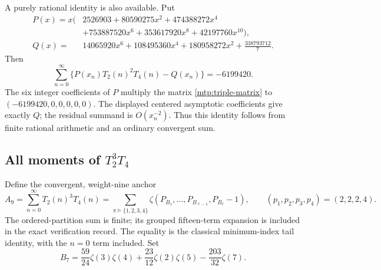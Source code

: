 \documentclass[11pt,letterpaper]{article}
\numberwithin{equation}{section}
\theoremstyle{definition}
\theoremstyle{remark}
\begin{document}
A purely rational identity is also available. Put
\begin{align*}
 P(x)=x\bigl(&2526903+80590275x^2+474388272x^4\\
             &+753887520x^6+353617920x^8+42197760x^{10}\bigr),\\
 Q(x)={}&14065920x^6+108495360x^4+180958272x^2+\frac{338793712}{7}.
\end{align*}
Then
\begin{equation}\label{mtp:rational-sum}
 \sum_{n=0}^{\infty}\bigl\{P(x_n)T_2(n)^2T_4(n)-Q(x_n)\bigr\}
                                      =-6199420.
\end{equation}
The six integer coefficients of $P$ multiply the matrix
\eqref{mtp:triple-matrix} to $(-6199420,0,0,0,0,0)$.
The displayed centered asymptotic coefficients give exactly $Q$;
the residual summand is $O(x_n^{-2})$. Thus this identity follows from
finite rational arithmetic and an ordinary convergent sum.

\subsection{All moments of \texorpdfstring{$T_2^3T_4$}{T2 cubed times T4}}

Define the convergent, weight-nine anchor
\begin{equation}\label{mtp:A9}
 A_9=\sum_{n=0}^{\infty}T_2(n)^3T_4(n)
   =\sum_{\pi\models\{1,2,3,4\}}
        \zeta(P_{B_1},\ldots,P_{B_{\ell-1}},P_{B_\ell}-1),
 \qquad(p_1,p_2,p_3,p_4)=(2,2,2,4).
\end{equation}
The ordered-partition sum is finite; its grouped fifteen-term expansion
is included in the exact verification record. The equality is the
classical minimum-index tail identity, with the $n=0$ term included.
Set
\begin{equation}\label{mtp:B7}
 B_7=\frac{59}{24}\zeta(3)\zeta(4)
              +\frac{23}{12}\zeta(2)\zeta(5)-\frac{203}{32}\zeta(7).
\end{equation}
\end{document}
